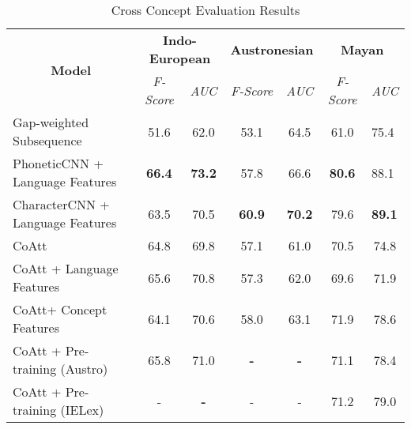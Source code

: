 \begin{table*}[t]
\centering
\begin{tabular}{lcccccc}
\multicolumn{1}{c}{\multirow{2}{*}{\textbf{Model}}} & \multicolumn{2}{c}{\textbf{Indo-European}} & \multicolumn{2}{c}{\textbf{Austronesian}} & \multicolumn{2}{c}{\textbf{Mayan}}                   \\ \cline{2-7} 
\multicolumn{1}{c}{}                                & \textit{F-Score}      & \textit{AUC}       & \textit{F-Score}      & \textit{AUC}      & \textit{F-Score} & \multicolumn{1}{l}{\textit{AUC}}  \\ \hline
Gap-weighted Subsequence                            & 51.6                  & 62.0               & 53.1                  & 64.5              & 61.0             & \multicolumn{1}{l}{75.4}          \\ \hline
PhoneticCNN + Language Features                     & \textbf{66.4}         & \textbf{73.2}      & 57.8                  & 66.6              & \textbf{80.6}    & \multicolumn{1}{l}{88.1}          \\
CharacterCNN + Language Features                    & 63.5                  & 70.5               & \textbf{60.9}         & \textbf{70.2}     & 79.6             & \multicolumn{1}{l}{\textbf{89.1}} \\ \hline
CoAtt                                               & 64.8                  & 69.8               & 57.1                  & 61.0              & 70.5             & 74.8                              \\
CoAtt + Language Features                           & 65.6                  & 70.8               & 57.3                  & 62.0              & 69.6             & 71.9                              \\
CoAtt+ Concept Features                             & 64.1                  & 70.6               & 58.0                  & 63.1              & 71.9             & 78.6                              \\
CoAtt + Pre-training (Austro)                       & 65.8                  & 71.0               & \textbf{-}            & \textbf{-}        & 71.1             & 78.4                              \\
CoAtt + Pre-training (IELex)                        & -                     & \textbf{-}         & -                     & -                 & 71.2             & 79.0                             
\end{tabular}
\label{CC_res}
\caption{Cross Concept Evaluation Results}
\end{table*}
